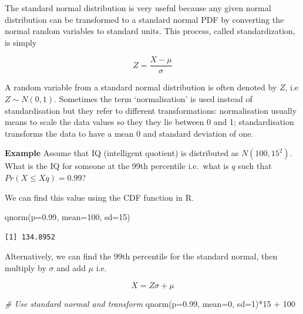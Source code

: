 \documentclass[
  oneside]{krantz}
\newenvironment{Shaded}{\begin{snugshade}}{\end{snugshade}}
\newcommand{\AttributeTok}[1]{\textcolor[rgb]{0.77,0.63,0.00}{#1}}
\newcommand{\CommentTok}[1]{\textcolor[rgb]{0.56,0.35,0.01}{\textit{#1}}}
\newcommand{\DecValTok}[1]{\textcolor[rgb]{0.00,0.00,0.81}{#1}}
\newcommand{\FloatTok}[1]{\textcolor[rgb]{0.00,0.00,0.81}{#1}}
\newcommand{\FunctionTok}[1]{\textcolor[rgb]{0.00,0.00,0.00}{#1}}
\newcommand{\NormalTok}[1]{#1}
\newcommand{\SpecialCharTok}[1]{\textcolor[rgb]{0.00,0.00,0.00}{#1}}
\begin{document}
The standard normal distribution is very useful because any given normal distribution can be transformed to a standard normal PDF by converting the normal random variables to standard units. This process, called standardization, is simply

\begin{equation}
Z = \frac{X - \mu}{\sigma}
\end{equation}

A random variable from a standard normal distribution is often denoted by \(Z\), i.e \(Z \sim N(0, 1)\). Sometimes the term `normalisation' is used instead of standardisation but they refer to different transformations: normalisation usually means to scale the data values so they they lie between 0 and 1; standardisation transforms the data to have a mean 0 and standard deviation of one.

\textbf{Example} Assume that IQ (intelligent quotient) is distributed as \(N(100,15^2)\). What is the IQ for someone at the 99th percentile i.e.~what is \(q\) such that \(Pr(X \le X q)=0.99\)?

We can find this value using the CDF function in R.

\begin{Shaded}
\begin{Highlighting}[]
\FunctionTok{qnorm}\NormalTok{(}\AttributeTok{p=}\FloatTok{0.99}\NormalTok{, }\AttributeTok{mean=}\DecValTok{100}\NormalTok{, }\AttributeTok{sd=}\DecValTok{15}\NormalTok{)}
\end{Highlighting}
\end{Shaded}

\begin{verbatim}
[1] 134.8952
\end{verbatim}

Alternatively, we can find the 99th percentile for the standard normal, then multiply by \(\sigma\) and add \(\mu\) i.e.~

\[ X = Z \sigma + \mu\]

\begin{Shaded}
\begin{Highlighting}[]
\CommentTok{\# Use standard normal and transform}
\FunctionTok{qnorm}\NormalTok{(}\AttributeTok{p=}\FloatTok{0.99}\NormalTok{, }\AttributeTok{mean=}\DecValTok{0}\NormalTok{, }\AttributeTok{sd=}\DecValTok{1}\NormalTok{)}\SpecialCharTok{*}\DecValTok{15} \SpecialCharTok{+} \DecValTok{100}
\end{Highlighting}
\end{Shaded}
\end{document}
